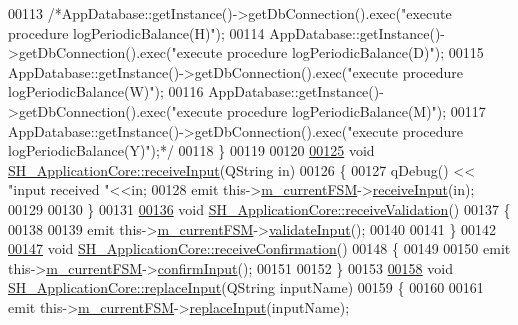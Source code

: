 \begin{DoxyCode}
00113     \textcolor{comment}{/*AppDatabase::getInstance()->getDbConnection().exec("execute procedure logPeriodicBalance(H)");}
00114 \textcolor{comment}{    AppDatabase::getInstance()->getDbConnection().exec("execute procedure logPeriodicBalance(D)");}
00115 \textcolor{comment}{    AppDatabase::getInstance()->getDbConnection().exec("execute procedure logPeriodicBalance(W)");}
00116 \textcolor{comment}{    AppDatabase::getInstance()->getDbConnection().exec("execute procedure logPeriodicBalance(M)");}
00117 \textcolor{comment}{    AppDatabase::getInstance()->getDbConnection().exec("execute procedure logPeriodicBalance(Y)");*/}
00118 \}
00119 
00120 
\hypertarget{SH__ApplicationCore_8cpp_source_l00125}{}\hyperlink{classSH__ApplicationCore_ae53ffaee0269f03c3c938595b9b4b39f}{00125} \textcolor{keywordtype}{void} \hyperlink{classSH__ApplicationCore_ae53ffaee0269f03c3c938595b9b4b39f}{SH\_ApplicationCore::receiveInput}(QString in)
00126 \{
00127     qDebug() << \textcolor{stringliteral}{"input received "}<<in;
00128     emit this->\hyperlink{classSH__ApplicationCore_a1088f3ba13abb8b3989cc0c325524232}{m\_currentFSM}->\hyperlink{classSH__InOutStateMachine_ab224e4a6ab99c15770bc63e1b8fdb771}{receiveInput}(in);
00129 
00130 \}
00131 
\hypertarget{SH__ApplicationCore_8cpp_source_l00136}{}\hyperlink{classSH__ApplicationCore_af450727db378ebec9ec61457b2e13664}{00136} \textcolor{keywordtype}{void} \hyperlink{classSH__ApplicationCore_af450727db378ebec9ec61457b2e13664}{SH\_ApplicationCore::receiveValidation}()
00137 \{
00138 
00139     emit this->\hyperlink{classSH__ApplicationCore_a1088f3ba13abb8b3989cc0c325524232}{m\_currentFSM}->\hyperlink{classSH__InOutStateMachine_a5a5804bd32a04d25926f6e323b906887}{validateInput}();
00140 
00141 \}
00142 
\hypertarget{SH__ApplicationCore_8cpp_source_l00147}{}\hyperlink{classSH__ApplicationCore_a942eacab69b9fe54442591c07773c908}{00147} \textcolor{keywordtype}{void} \hyperlink{classSH__ApplicationCore_a942eacab69b9fe54442591c07773c908}{SH\_ApplicationCore::receiveConfirmation}()
00148 \{
00149 
00150     emit this->\hyperlink{classSH__ApplicationCore_a1088f3ba13abb8b3989cc0c325524232}{m\_currentFSM}->\hyperlink{classSH__InOutStateMachine_a0fb4c4d63ccb19df48f1e060d02d8ae3}{confirmInput}();
00151 
00152 \}
00153 
\hypertarget{SH__ApplicationCore_8cpp_source_l00158}{}\hyperlink{classSH__ApplicationCore_ae8bcd097ea219fc9a54f7d0d9ff9c335}{00158} \textcolor{keywordtype}{void} \hyperlink{classSH__ApplicationCore_ae8bcd097ea219fc9a54f7d0d9ff9c335}{SH\_ApplicationCore::replaceInput}(QString inputName)
00159 \{
00160 
00161     emit this->\hyperlink{classSH__ApplicationCore_a1088f3ba13abb8b3989cc0c325524232}{m\_currentFSM}->\hyperlink{classSH__InOutStateMachine_af5f82970faef3bca48a147863dba2ee1}{replaceInput}(inputName);

\end{DoxyCode}

